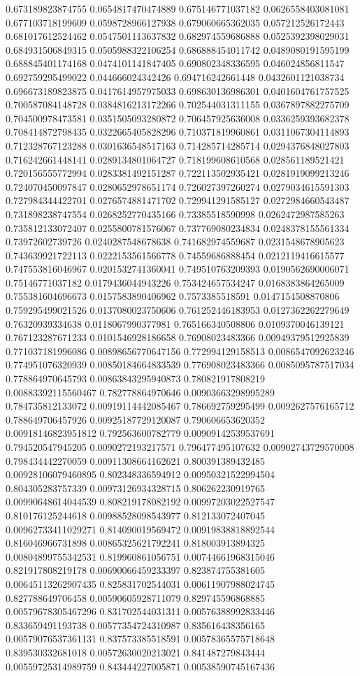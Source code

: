 \begin{table}
\begin{tabu}
\begin{sparkline}{10}
0.673189823874755 0.0654817470474889 0.675146771037182 0.0626558403081081 0.677103718199609 0.0598728966127938 0.679060665362035 0.057212526172443 0.681017612524462 0.0547501113637832 0.682974559686888 0.0525392398029031 0.684931506849315 0.0505988322106254 0.686888454011742 0.0489080191595199 0.688845401174168 0.0474101141847405 0.690802348336595 0.046024856811547 0.692759295499022 0.044666024342426 0.694716242661448 0.0432601121038734 0.696673189823875 0.0417614957975033 0.698630136986301 0.0401604761757525 0.700587084148728 0.0384816213172266 0.702544031311155 0.0367897882275709 0.704500978473581 0.0351505093280872 0.706457925636008 0.0336259393682378 0.708414872798435 0.0322665405828296 0.710371819960861 0.0311067304114893 0.712328767123288 0.0301636548517163 0.714285714285714 0.0294376848027803 0.716242661448141 0.0289134801064727 0.718199608610568 0.028561189521421 0.720156555772994 0.0283381492151287 0.722113502935421 0.0281919099213246 0.724070450097847 0.0280652978651174 0.726027397260274 0.0279034615591303 0.727984344422701 0.0276574881471702 0.729941291585127 0.0272984660543487 0.731898238747554 0.0268252770435166 0.73385518590998 0.0262472987585263 0.735812133072407 0.0255800781576067 0.737769080234834 0.0248378155561334 0.73972602739726 0.0240287548678638 0.741682974559687 0.0231548678905623 0.743639921722113 0.0222153561566778 0.74559686888454 0.0212119416615577 0.747553816046967 0.0201532741360041 0.749510763209393 0.0190562690006071 0.75146771037182 0.0179436044943226 0.753424657534247 0.0168383864265009 0.755381604696673 0.0157583890406962 0.7573385518591 0.0147154508870806 0.759295499021526 0.0137080023750606 0.761252446183953 0.0127362262279649 0.76320939334638 0.0118067990377981 0.765166340508806 0.0109370046139121 0.767123287671233 0.0101546928186658 0.76908023483366 0.00949379512925839 0.771037181996086 0.00898656770647156 0.772994129158513 0.0086547092623246 0.774951076320939 0.00850184664833539 0.776908023483366 0.0085095787517034 0.778864970645793 0.00863843295940873 0.780821917808219 0.00883392115560467 0.782778864970646 0.00903663298995289 0.784735812133072 0.00919114442085467 0.786692759295499 0.0092627576165712 0.788649706457926 0.00925187729120087 0.790606653620352 0.00918146823951812 0.792563600782779 0.00909142539537691 0.794520547945205 0.0090272193217571 0.796477495107632 0.00902743729570008 0.798434442270059 0.00911308664162621 0.800391389432485 0.00928106079460895 0.802348336594912 0.00950321522994504 0.804305283757339 0.00973126934328715 0.806262230919765 0.00990648614044539 0.808219178082192 0.00997203022527547 0.810176125244618 0.00988528098543977 0.812133072407045 0.00962733411029271 0.814090019569472 0.00919838818892544 0.816046966731898 0.00865325621792241 0.818003913894325 0.00804899755342531 0.819960861056751 0.00744661968315046 0.821917808219178 0.00690066459233397 0.823874755381605 0.00645113262907435 0.825831702544031 0.00611907988024745 0.827788649706458 0.00590605928711079 0.829745596868885 0.00579678305467296 0.831702544031311 0.00576388992833446 0.833659491193738 0.00577354724310987 0.835616438356165 0.00579076537361131 0.837573385518591 0.00578365575718648 0.839530332681018 0.00572630020213021 0.841487279843444 0.00559725314989759 0.843444227005871 0.00538590745167436 
\end{sparkline}
\end{tabu}
\end{table}
